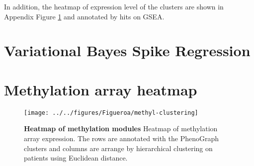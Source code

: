 \documentclass{article}
\begin{document}
In addition, the heatmap of expression level of the clusters are shown in Appendix Figure \ref{heatmap} and annotated by hits on GSEA. 

\clearpage

\section{Variational Bayes Spike Regression}



\clearpage

\appendix

\section{Methylation array heatmap}

\begin{figure}[htbp]
\begin{center}
\texttt{[image: ../../figures/Figueroa/methyl-clustering]}
\caption[Heatmap of methylation modules]{\textbf{Heatmap of methylation modules} Heatmap of methylation array expression. The rows are annotated with the PhenoGraph clusters and columns are arrange by hierarchical clustering on patients using Euclidean distance. }
\label{heatmap}
\end{center}
\end{figure}


\clearpage
\end{document}
